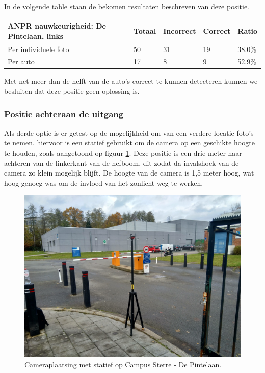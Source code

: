 In de volgende table staan de bekomen resultaten beschreven van deze positie.
\begin{table}[h!]
	\centering
	\begin{tabular}{l|l|l|l|l}
		\textbf{ANPR nauwkeurigheid: De Pintelaan, links} & Totaal & Incorrect & Correct & Ratio	\\ \hline
		Per individuele foto 	& 50 & 31	& 19	& 38.0\%\\
		Per auto				& 17 & 8	& 9 	& 52.9\%\\
	\end{tabular}
\end{table}

Met net meer dan de helft van de auto's correct te kunnen detecteren kunnen we besluiten dat deze positie geen oplossing is.

\subsubsection{Positie achteraan de uitgang}
Als derde optie is er getest op de mogelijkheid om van een verdere locatie foto's te nemen. hiervoor is een statief gebruikt om de camera op een geschikte hoogte te houden, zoals aangetoond op figuur \ref{plaatsingdepintelaan}. Deze positie is een drie meter naar achteren van de linkerkant van de hefboom, dit zodat da invalshoek van de camera zo klein mogelijk blijft. De hoogte van de camera is 1,5 meter hoog, wat hoog genoeg was om de invloed van het zonlicht weg te werken.
\begin{figure}[h!]
	\centering
	\includegraphics[width=0.8\linewidth]{img/depintelaanstatief.jpg}
	\caption{Cameraplaatsing met statief op Campus Sterre - De Pintelaan.}
	\label{plaatsingdepintelaan}
\end{figure}

